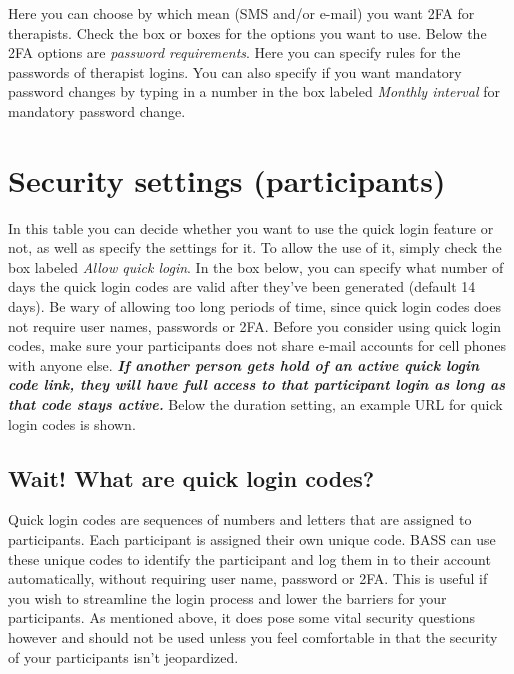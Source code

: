 \documentclass[]{book}
\begin{document}
Here you can choose by which mean (SMS and/or e-mail) you want 2FA for therapists. Check the box or boxes for the options you want to use.
Below the 2FA options are \emph{password requirements}. Here you can specify rules for the passwords of therapist logins. You can also specify if you want mandatory password changes by typing in a number in the box labeled \emph{Monthly interval} for mandatory password change.

\hypertarget{security-settings-participants}{%
\section{Security settings (participants)}\label{security-settings-participants}}

In this table you can decide whether you want to use the quick login feature or not, as well as specify the settings for it. To allow the use of it, simply check the box labeled \emph{Allow quick login}.
In the box below, you can specify what number of days the quick login codes are valid after they've been generated (default 14 days). Be wary of allowing too long periods of time, since quick login codes does not require user names, passwords or 2FA. Before you consider using quick login codes, make sure your participants does not share e-mail accounts for cell phones with anyone else. \textbf{\emph{If another person gets hold of an active quick login code link, they will have full access to that participant login as long as that code stays active.}}
Below the duration setting, an example URL for quick login codes is shown.

\hypertarget{wait-what-are-quick-login-codes}{%
\subsection{Wait! What are quick login codes?}\label{wait-what-are-quick-login-codes}}

Quick login codes are sequences of numbers and letters that are assigned to participants. Each participant is assigned their own unique code. BASS can use these unique codes to identify the participant and log them in to their account automatically, without requiring user name, password or 2FA. This is useful if you wish to streamline the login process and lower the barriers for your participants. As mentioned above, it does pose some vital security questions however and should not be used unless you feel comfortable in that the security of your participants isn't jeopardized.
\end{document}
